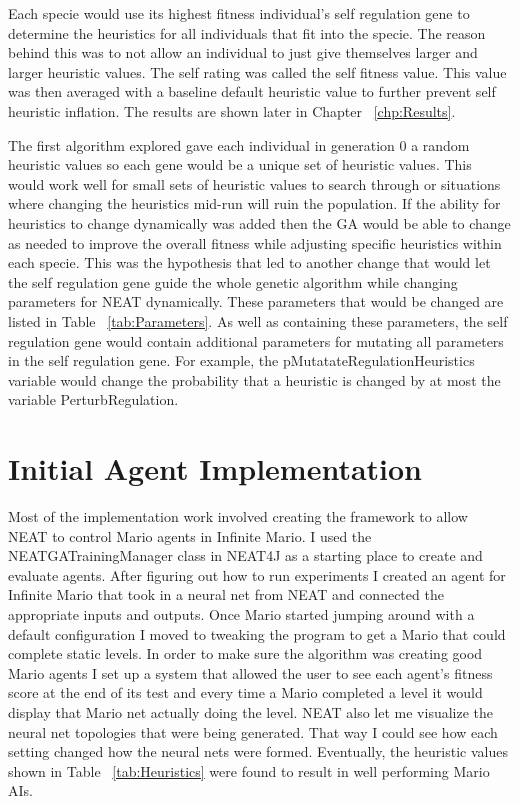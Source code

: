 \documentclass[12pt]{ucthesis} \newif\ifpdf \ifx\pdfoutput\undefined
\begin{document}
Each specie would use its highest fitness individual’s self regulation gene to
determine the heuristics for all individuals that fit into the specie. The
reason behind this was to not allow an individual to just give themselves larger
and larger heuristic values. The self rating was called the self fitness value.
This value was then averaged with a baseline default heuristic value to further
prevent self heuristic inflation. The results are shown later in Chapter
~\ref{chp:Results}.

The first algorithm explored gave each individual in generation 0 a random
heuristic values so each gene would be a unique set of heuristic values. This
would work well for small sets of heuristic values to search through or
situations where changing the heuristics mid-run will ruin the population. If the ability
for heuristics to change dynamically was added then the GA would be able to
change as needed to improve the overall fitness while adjusting specific
heuristics within each specie. This was the hypothesis that led to another
change that would let the self regulation gene guide the whole genetic algorithm
while changing parameters for NEAT dynamically. These parameters that would be
changed are listed in Table ~\ref{tab:Parameters}. As well as containing these
parameters, the self regulation gene would contain additional parameters for
mutating all parameters in the self regulation gene.
For example, the pMutatateRegulationHeuristics variable would change the
probability that a heuristic is changed by at most the variable
PerturbRegulation.


\section{Initial Agent Implementation}

Most of the implementation work involved creating the framework to allow NEAT to
control Mario agents in Infinite Mario. I used the NEATGATrainingManager class
in NEAT4J as a starting place to create and evaluate agents.
After figuring out how to run experiments I created an agent for
Infinite Mario that took in a neural net from NEAT and connected the appropriate
inputs and outputs. Once Mario started jumping around with a default configuration I moved
to tweaking the program to get a Mario that could complete static levels.
In order to make sure the algorithm was creating good Mario agents I set up a
system that allowed the user to see each agent's fitness score at the end of its
test and every time a Mario completed a level it would display that Mario net
actually doing the level. NEAT also let me visualize the neural net topologies
that were being generated. That way I could see how each setting changed how the
neural nets were formed. Eventually, the heuristic values shown in Table
~\ref{tab:Heuristics} were found to result in well performing Mario AIs.
 
\end{document}
